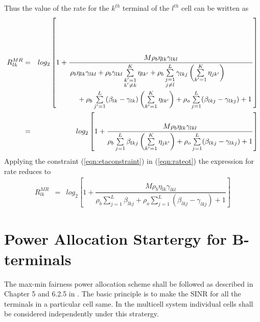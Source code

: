 \documentclass[10pt, a4paper, twoside,fleqn]{article}
\begin{document}
Thus the value of the rate for the $k^{th}$ terminal of the $l^{th}$ cell can be written as
\begin{eqnarray}\label{eqn:rateot}
R_{lk}^{MR} &=& log_2\left[1+ \dfrac{M\rho_b\eta_{lk}\gamma_{lkl}}
{\splitdfrac{\rho_b\eta_{lk}\gamma_{lkl}
    +\rho_b\gamma_{lkl}\sum\limits_{\substack{k'=1\\ k'\neq k}}^{K}\eta_{lk'}
    +\rho_b\sum\limits_{\substack{j=1 \\ j \neq l}}^{L}\gamma_{lkj}\left(\sum\limits_{k'=1}^{K}\eta_{jk'}\right)}
    {+\rho_b\sum\limits_{j'=1}^{L}(\beta_{lk}-\gamma_{lk})\left(\sum\limits_{k'=1}^{K}\eta_{lk'}\right)
    +\rho_o\sum\limits_{j=1}^{L}(\beta_{lkj} -\gamma_{lkj})
    +1}}\right] \nonumber \\
        &=& log_2\left[1+\dfrac{M\rho_b\eta_{lk}\gamma_{lkl}}{\rho_b\sum\limits_{j=1}^{L}\beta_{lkj}\left(\sum\limits_{k'=1}^{K}\eta_{jk'}\right)+\rho_o\sum\limits_{j=1}^{L}(\beta_{lkj} -\gamma_{lkj})+1}\right]
\end{eqnarray}
Applying the constraint (\ref{eqn:etaconstraint}) in (\ref{eqn:rateot}) the expression for rate reduces to
\begin{eqnarray}\label{eqn:finalratebt}
R_{lk}^{MR} &=& log_2\left[1+\dfrac{M\rho_b\eta_{lk}\gamma_{lkl}}{\rho_b\sum\limits_{j=1}^{L}\beta_{lkj}+\rho_o\sum\limits_{j=1}^{L}(\beta_{lkj} -\gamma_{lkj})+1}\right]
\end{eqnarray}


\section{Power Allocation Startergy for B-terminals}
  The max-min fairness power allocation scheme shall be followed as described in Chapter 5 and 6.2.5 in \cite{bib:MassiveMimoBook}. The basic principle is to make the SINR for all the terminals in a particular cell same. In the multicell system individual cells shall be considered independently under this stratergy. 
\end{document}
